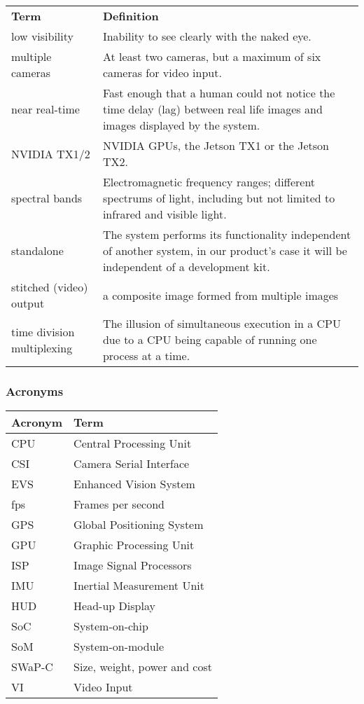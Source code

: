 \documentclass[letterpaper,10pt,serif,draftclsnofoot,onecolumn,compsoc,titlepage]{IEEEtran}
\begin{document}
\begin{tabular}{|l|p{11cm}|}
	\hline
	\textbf{Term} & \textbf{Definition}\\
	low visibility & Inability to see clearly with the naked eye.\\
	\hline	
	multiple cameras & At least two cameras, but a maximum of six cameras for 
	video input.\\
	\hline
	near real-time & Fast enough that a human could not notice the time 
	delay (lag) between \newline real life images and images displayed by the system.\\
	\hline
	NVIDIA TX1/2 & NVIDIA GPUs, the Jetson TX1 or the Jetson TX2.\\
	\hline
	spectral bands & Electromagnetic frequency ranges; different 
	spectrums of light, including \newline but not limited to infrared 
	and visible light.\\
	\hline
	standalone & The system performs its functionality independent of another
	system, in our product's case it will be independent of a development kit. \\
	\hline
	stitched (video) output & a composite image formed from multiple images\\
	\hline
	time division multiplexing & The illusion of simultaneous execution in a CPU due
	to a CPU being capable of running one process at a time.\\
	\hline
\end{tabular}

\subsubsection{Acronyms}

\begin{tabular}{|l|l|}
	\hline
	\textbf{Acronym} & \textbf{Term}\\
	\hline
	CPU & Central Processing Unit\\
	\hline
	CSI & Camera Serial Interface\\
	\hline
	EVS & Enhanced Vision System\\
	\hline
	fps & Frames per second\\
	\hline
	GPS & Global Positioning System\\
	\hline
	GPU & Graphic Processing Unit\\
	\hline
	ISP & Image Signal Processors\\
	\hline
	IMU & Inertial Measurement Unit\\
	\hline
	HUD & Head-up Display\\
	\hline
	SoC & System-on-chip\\
	\hline
	SoM & System-on-module\\
	\hline
	SWaP-C & Size, weight, power and cost\\
	\hline
	VI & Video Input\\
	\hline
\end{tabular}
\end{document}
